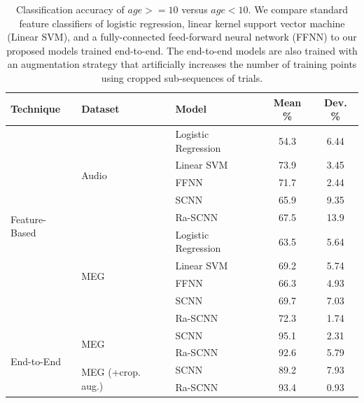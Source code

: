 \documentclass[fleqn,10pt]{wlscirep}
\begin{document}
\begin{table}[htp]
  \caption{Classification accuracy of $age >= 10$ versus $age < 10$. We compare standard feature classifiers of logistic regression, linear kernel support vector machine (Linear SVM), and a fully-connected feed-forward neural network (FFNN) to our proposed models trained end-to-end. The end-to-end models are also trained with an augmentation strategy that artificially increases the number of training points using cropped sub-sequences of trials.}
  \centering
  \begin{tabular}{l | l  l | c | c }
    \toprule
    \textbf{Technique} & \textbf{Dataset} & \textbf{Model} & \textbf{Mean \%} & \textbf{Dev. \%} \\
    \toprule
    \multirow{10}{*}{Feature-Based} & \multirow{5}{*}{Audio} & Logistic Regression      & 54.3 & 6.44  \\
                                    &                        & Linear SVM               & 73.9 & 3.45  \\
                                    &                        & FFNN                     & 71.7 & 2.44  \\
                                    &                        & SCNN                     & 65.9 & 9.35  \\
                                    &                        & Ra-SCNN                  & 67.5 & 13.9  \\
    \cline{2-5}
                                    & \multirow{5}{*}{MEG}   & Logistic Regression    & 63.5 & 5.64  \\
                                    &                        & Linear SVM             & 69.2 & 5.74  \\
                                    &                        & FFNN                   & 66.3 & 4.93  \\
                                    &                        & SCNN                   & 69.7 & 7.03  \\
                                    &                        & Ra-SCNN                & 72.3 & 1.74  \\    
    \midrule
    \multirow{4}{*}{End-to-End}     & \multirow{2}{*}{MEG}   & SCNN                   & 95.1 & 2.31  \\
                                    &                        & Ra-SCNN                & 92.6 & 5.79  \\     
    \cline{2-5}
                                    & \multirow{2}{*}{MEG (+crop. aug.)}  & SCNN      & 89.2 & 7.93  \\
                                    &                        & Ra-SCNN                & 93.4 & 0.93  \\         
    \bottomrule
  \end{tabular}
  \label{tab:binary_results}
\end{table}
\end{document}
